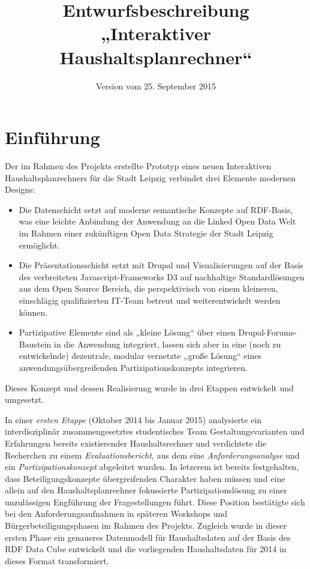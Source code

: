 \documentclass[a4paper,11pt,twoside]{article}
\title{Entwurfsbeschreibung „Interaktiver Haushaltsplanrechner“}
\date{Version vom 25. September 2015}
\begin{document}
\maketitle
\tableofcontents
\newpage
\seitezwei
\newpage

\section{Einführung}

Der im Rahmen des Projekts erstellte Prototyp eines neuen Interaktiven
Haushaltsplanrechners für die Stadt Leipzig verbindet drei Elemente modernen
Designs:
\begin{itemize}
\item Die Datenschicht setzt auf moderne semantische Konzepte auf RDF-Basis,
  was eine leichte Anbindung der Anwendung an die Linked Open Data Welt im
  Rahmen einer zukünftigen Open Data Strategie der Stadt Leipzig ermöglicht. 
\item Die Präsentationsschicht setzt mit Drupal und Visualisierungen auf der
  Basis des verbreiteten Javascript-Frameworks D3 auf nachhaltige
  Standardlösungen aus dem Open Source Bereich, die perspektivisch von einem
  kleineren, einschlägig qualifizierten IT-Team betreut und weiterentwickelt
  werden können.
\item Partizipative Elemente sind als „kleine Lösung“ über einen
  Drupal-Forums-Baustein in die Anwendung integriert, lassen sich aber in eine
  (noch zu entwickelnde) dezentrale, modular vernetzte „große Lösung“ eines
  anwendungsübergreifenden Partizipationskonzepts integrieren.
\end{itemize}
Dieses Konzept und dessen Realisierung wurde in drei Etappen entwickelt und
umgesetzt.

In einer \emph{ersten Etappe} (Oktober 2014 bis Januar 2015) analysierte ein
interdisziplinär zusammengesetztes studentisches Team Gestaltungsvarianten und
Erfahrungen bereits existierender Haushaltsrechner und verdichtete die
Recherchen zu einem \emph{Evaluationsbericht}, aus dem eine
\emph{Anforderungsanalyse} und ein \emph{Partizipationskonzept} abgeleitet
wurden.  In letzerem ist bereits festgehalten, dass Beteiligungskonzepte
übergreifenden Charakter haben müssen und eine allein auf den
Haushaltsplanrechner fokussierte Partizipationslösung zu einer unzulässigen
Engführung der Fragestellungen führt. Diese Position bestätigte sich bei den
Anforderungsaufnahmen in späteren Workshops und Bürgerbeteiligungsphasen im
Rahmen des Projekts.  Zugleich wurde in dieser ersten Phase ein genaueres
Datenmodell für Haushaltsdaten auf der Basis des RDF Data Cube entwickelt und
die vorliegenden Haushaltsdaten für 2014 in dieses Format transformiert.
\end{document}
